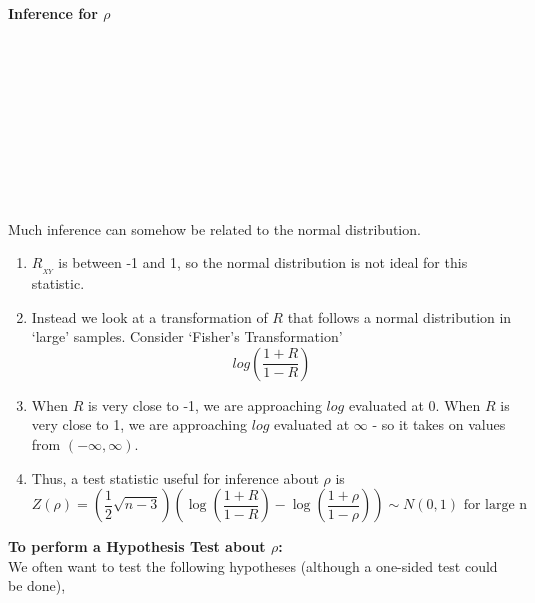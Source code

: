 \Large \textbf{Inference for $\rho$} \large\\


~\\~\\~\\~\\~\\~\\~\\~\\~\\~\\
Much inference can somehow be related to the normal distribution.  
\begin{enumerate}
\item $R_{_{XY}}$ is between -1 and 1, so the normal distribution is not ideal for this statistic.
\item Instead we look at a transformation of $R$ that follows a normal distribution in `large' samples. Consider `Fisher's Transformation'
$$log\left(\frac{1+R}{1-R}\right)$$
\item When $R$ is very close to -1, we are approaching $log$ evaluated at 0.  When $R$ is very close to 1, we are approaching $log$ evaluated at $\infty$ - so it takes on values from $(-\infty, \infty)$. 
\item Thus, a test statistic useful for inference about $\rho$ is
$$Z(\rho)= \left(\frac{1}{2}\sqrt{n-3}\right)\left(\log \left(\frac{1+R}{1-R}\right) - \log \left(\frac{1+\rho}{1-\rho}\right)\right)\sim N(0,1)\mbox{ for large n}$$ 
\end{enumerate}

\newpage

\Large\textbf{To perform a Hypothesis Test about $\rho$:}\large\\
We often want to test the following hypotheses (although a one-sided test could be done),\\~\\~\\~\\~\\~\\~\\

